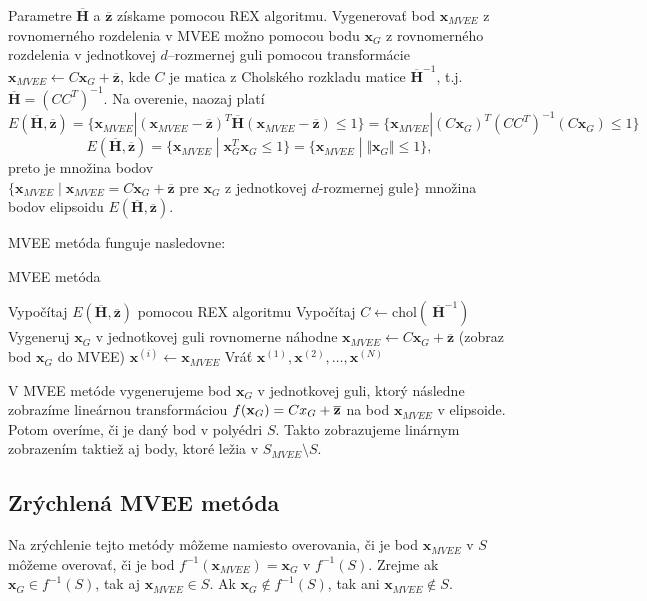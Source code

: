 Parametre $\mathbf{\overline H}$ a $\mathbf{\overline z}$ získame pomocou REX algoritmu. Vygenerovať bod $\mathbf x_{MVEE}$ z rovnomerného rozdelenia v MVEE možno pomocou bodu $\mathbf x_G$ z rovnomerného rozdelenia v jednotkovej $d$--rozmernej guli pomocou transformácie $\mathbf x_{MVEE} \leftarrow C \mathbf x_G+ \mathbf{\overline z}$, kde $C$ je matica z Cholského rozkladu matice $\mathbf{\overline H}^{-1}$, t.j. $\mathbf{\overline H}=(CC^T)^{-1}$. Na overenie, naozaj platí 
$$E(\mathbf{\overline H, \overline z})
=\{ \mathbf x_{MVEE} | (\mathbf x_{MVEE} - \mathbf{\overline z})^T \mathbf{\overline H} (\mathbf x_{MVEE}-\mathbf{\overline z}) \leq 1\}
=\{ \mathbf x_{MVEE} | (C \mathbf x_G)^T (CC^T)^{-1} (C \mathbf x_G) \leq 1 \}$$
$$E(\mathbf{\overline H, \overline z})
= \{ \mathbf x_{MVEE} \; | \; \mathbf x_G^T \mathbf x_G \leq 1 \} = \{ \mathbf x_{MVEE} \; | \;\Vert \mathbf x_G \Vert \leq 1 \},$$
preto je množina bodov $\{ \mathbf x_{MVEE} \; | \; \mathbf x_{MVEE} = C \mathbf x_G+ \mathbf{\overline z} \text{ pre } \mathbf x_G \text{ z jednotkovej $d$-rozmernej gule} \}$ množina bodov elipsoidu $E(\mathbf{\overline H, \overline z})$.

MVEE metóda funguje nasledovne:

\begin{algorithm}[H]
	\caption{MVEE metóda}
	\label{MVEE}
	\begin{algorithmic}[1]
		\State Vypočítaj $E(\mathbf{\overline H, \overline z})$ pomocou REX algoritmu
		\State Vypočítaj $C \leftarrow \text{chol}(\: \mathbf{\overline H}^{-1})$
			\Repeat
			\State Vygeneruj $\mathbf x_G$ v jednotkovej guli rovnomerne náhodne
			\State $\mathbf x_{MVEE} \leftarrow C \mathbf x_G+ \mathbf{\overline z}$ (zobraz bod $\mathbf x_G$ do MVEE)
			\State $\mathbf x^{(i)} \leftarrow \mathbf x_{MVEE}$
		\EndFor
		\State Vráť ${\mathbf x^{(1)},\mathbf x^{(2)},\dots,\mathbf x^{(N)}}$
	\end{algorithmic}
\end{algorithm}

V MVEE metóde vygenerujeme bod $\mathbf x_G$ v jednotkovej guli, ktorý následne zobrazíme lineárnou transformáciou $f(\mathbf x_G)=C \mathbf \mathbf x_G +\mathbf{\overline z}$ na bod $\mathbf x_{MVEE}$ v elipsoide. Potom overíme, či je daný bod v polyédri $S$. Takto zobrazujeme linárnym zobrazením taktiež aj body, ktoré ležia v $S_{MVEE} \setminus S$.

\subsection{Zrýchlená MVEE metóda}
Na zrýchlenie tejto metódy môžeme namiesto overovania, či je bod $\mathbf x_{MVEE}$ v $S$ môžeme overovať, či je bod $f^{-1}(\mathbf x_{MVEE})=\mathbf x_G$ v $f^{-1}(S)$. Zrejme ak $\mathbf x_G \in f^{-1}(S)$, tak aj $\mathbf x_{MVEE} \in S$. Ak $\mathbf x_G \not \in f^{-1}(S)$, tak ani $\mathbf x_{MVEE} \not \in S$.

